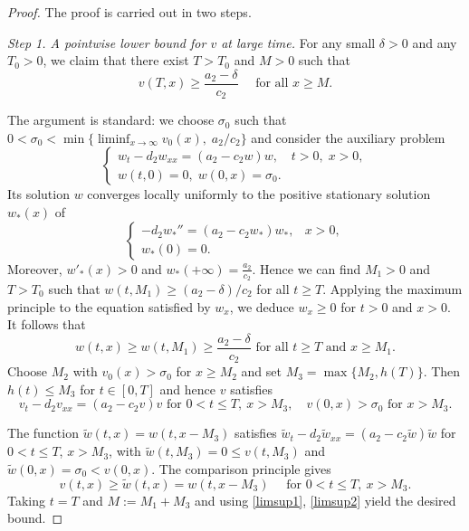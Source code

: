 \documentclass[10pt,a4paper]{amsart}
\begin{document}
	\begin{proof}
		The proof is carried out in two steps.
		
		\textit{Step 1.  A pointwise lower bound for \(v\) at large time.}  
		For any small \(\delta>0\) and any \(T_0>0\), we claim that there exist \(T>T_0\) and \(M>0\) such that
		\[
		v(T,x) \ge \frac{a_2-\delta}{c_2}\quad\text{ for all } x\ge M.
		\]
		
		The argument is standard: we choose $\sigma_0$ such that \(0<\sigma_0<\min\bigl\{\liminf_{x\to\infty}v_0(x),\; a_2/c_2\bigr\}\) and consider the auxiliary problem
		\[
		\begin{cases}
			w_t-d_2w_{xx}=(a_2-c_2w)w, & t>0,\;x>0,\\
			w(t,0)=0,\; w(0,x)=\sigma_0.
		\end{cases}
		\]
		Its solution $w$ converges locally uniformly to the positive stationary solution \(w_*(x)\) of 
		\[
		\begin{cases}
			-d_2w_*''=(a_2-c_2w_*)w_*, & x>0,\\
			w_*(0)=0.
		\end{cases}
		\]
		Moreover, $w'_*(x) > 0$ and $w_*(+\infty) = \frac{a_2}{c_2}$. Hence we can find \(M_1>0\) and \(T>T_0\) such that \(w(t,M_1)\ge (a_2-\delta)/c_2\) for all $t \geq T$.
		Applying the maximum principle to the equation satisfied by $w_x$, we deduce $w_x \ge 0$ for $t >0$ and $x>0$. It follows that
		\begin{equation}\label{limsup1}
			w(t,x) \geq w(t,M_1)\ge \frac{a_2 - \delta}{c_2} \text{ for all } t  \geq T \text{ and } x \geq M_1.
		\end{equation}
		Choose \(M_2\) with \(v_0(x)>\sigma_0\) for \(x\ge M_2\) and set \(M_3=\max\{M_2,h(T)\}\).  Then \(h(t)\le M_3\) for \(t\in[0,T]\) and hence $v$ satisfies
		\[
		v_t - d_2v_{xx} = (a_2 - c_2v)v \text{ for } 0 < t \leq T, ~ x > M_3, \quad v(0,x) > \sigma_0 \text{ for } x > M_3.	
		\]
		
		The function \(\tilde w(t,x)=w(t,x-M_3)\) satisfies \(\tilde w_t-d_2\tilde w_{xx}=(a_2-c_2\tilde w)\tilde w\) for \(0<t\le T\), \(x>M_3\), with \(\tilde w(t,M_3)=0\le v(t,M_3)\) and \(\tilde w(0,x)=\sigma_0<v(0,x)\).  The comparison principle gives
		\begin{equation}\label{limsup2}
			v(t, x) \geq \tilde{w}(t, x) = w(t, x - M_3) \quad \text{ for } 0 < t \leq T, ~ x > M_3.
		\end{equation}
		Taking \(t=T\) and \(M:=M_1+M_3\) and using \eqref{limsup1}, \eqref{limsup2} yield the desired bound.
		

\end{proof}
\end{document}
